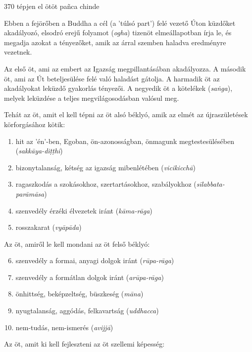
\begin{notesdescription}

\item[{370}
{tépjen el ötöt}
{pañca chinde}] \hfill\par

Ebben a fejörőben a Buddha a cél (a 'túlsó part') felé vezető Úton küzdőket akadályozó, elsodró erejű folyamot (\textit{ogha}) tizenöt elmeállapotban írja le, és megadja azokat a tényezőket, amik az árral szemben haladva eredményre vezetnek.

Az első öt, ami az embert az Igazság megpillantásában akadályozza. A második öt, ami az Út beteljesülése felé való haladást gátolja. A harmadik öt az akadályokat leküzdő gyakorlás tényezői. A negyedik öt a kötelékek (\textit{saṅga}), melyek leküzdése a teljes megvilágosodásban valósul meg.

Tehát az öt, amit el kell tépni az öt alsó béklyó, amik az elmét az újraszületések körforgásához kötik:

\begin{enumerate}
\item hit az 'én'-ben, Egoban, ön-azonosságban, önmagunk megtestesülésében (\textit{sakkāya-diṭṭhi})
\item bizonytalanság, kétség az igazság mibenlétében (\textit{vicikicchā})
\item ragaszkodás a szokásokhoz, szertartásokhoz, szabályokhoz (\textit{sīlabbata-parāmāsa})
\item szenvedély érzéki élvezetek iránt (\textit{kāma-rāga})
\item rosszakarat (\textit{vyāpāda})
\end{enumerate}

Az öt, amiről le kell mondani az öt felső béklyó:

\begin{enumerate}
\setcounter{enumi}{5}
\item szenvedély a formai, anyagi dolgok iránt (\textit{rūpa-rāga})
\item szenvedély a formátlan dolgok iránt (\textit{arūpa-rāga})
\item önhittség, beképzeltség, büszkeség (\textit{māna})
\item nyugtalanság, aggódás, felkavartság (\textit{uddhacca})
\item nem-tudás, nem-ismerés (\textit{avijjā})
\end{enumerate}

Az öt, amit ki kell fejleszteni az öt szellemi képesség:


\end{notesdescription}
